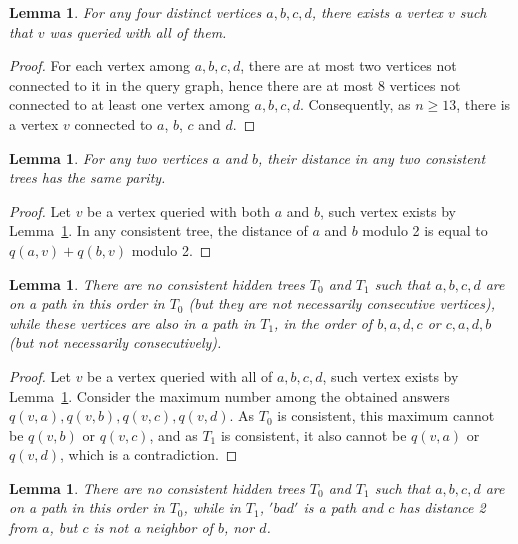 \documentclass[12pt,a4paper]{amsart}
\theoremstyle{plain}
\newtheorem{lemma}[theorem]{Lemma}
\theoremstyle{definition}
\begin{document}
\begin{lemma} \label{null}
    For any four distinct vertices $a,b,c,d$, there exists a vertex $v$ such that $v$ was queried with all of them.
\end{lemma}

\begin{proof}
    For each vertex among $a,b,c,d$, there are at most two vertices not connected to it in the query graph, hence there are at most $8$ vertices not connected to at least one vertex among $a,b,c,d$. Consequently, as $n \geq 13$, there is a vertex $v$ connected to $a$, $b$, $c$ and $d$.
\end{proof}

\begin{lemma} \label{parity}
    For any two vertices $a$ and $b$, their distance in any two consistent trees has the same parity.
\end{lemma}

\begin{proof}
    Let $v$ be a vertex queried with both $a$ and $b$, such vertex exists by Lemma~\ref{null}. In any consistent tree, the distance of $a$ and $b$ modulo 2 is equal to $q(a,v)+q(b,v)$ modulo 2.
\end{proof}

\begin{lemma}\label{lemm1}
    There are no consistent hidden trees $T_0$ and $T_1$ such that $a,b,c,d$ are on a path in this order in $T_0$ (but they are not necessarily consecutive vertices), while these vertices are also in a path in $T_1$, in the order of $b,a,d,c$ or $c,a,d,b$ (but not necessarily consecutively).
\end{lemma}

\begin{proof}
    Let $v$ be a vertex queried with all of $a,b,c,d$, such vertex exists by Lemma~\ref{null}. Consider the maximum number among the obtained answers $q(v,a), q(v,b), q(v,c), q(v,d)$. As $T_0$ is consistent, this maximum cannot be $q(v,b)$ or $q(v,c)$, and as $T_1$ is consistent, it also cannot be $q(v,a)$ or $q(v,d)$, which is a contradiction.
\end{proof}

\begin{lemma}\label{lemm2}
    There are no consistent hidden trees $T_0$ and $T_1$ such that $a,b,c,d$ are on a path in this order in $T_0$, while in $T_1$, $'bad'$ is a path and $c$ has distance 2 from $a$, but $c$ is not a neighbor of $b$, nor $d$.
\end{lemma}
\end{document}
